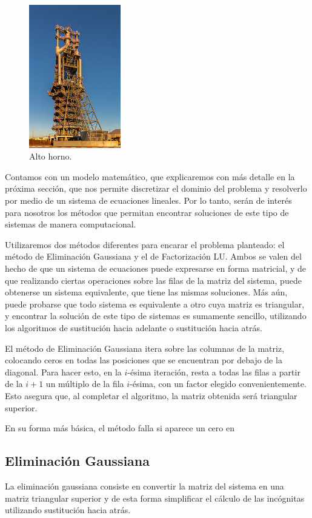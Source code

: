 \documentclass[11pt, a4paper, spanish]{article}
\theoremstyle{plain}
\theoremstyle{remark}
\begin{document}
  \begin{figure}[h]
    \centering
    \includegraphics[width=4cm]{altoHorno.jpg}
    \caption{Alto horno.}
  \end{figure}

  Contamos con un modelo matemático, que explicaremos con más detalle en la próxima sección, que nos permite discretizar el dominio del problema y resolverlo por medio de un sistema de ecuaciones lineales. Por lo tanto, serán de interés para nosotros los métodos que permitan encontrar soluciones de este tipo de sistemas de manera computacional.

  Utilizaremos dos métodos diferentes para encarar el problema planteado: el método de Eliminación Gaussiana y el de Factorización LU. Ambos se valen del hecho de que un sistema de ecuaciones puede expresarse en forma matricial, y de que realizando ciertas operaciones sobre las filas de la matriz del sistema, puede obtenerse un sistema equivalente, que tiene las mismas soluciones. Más aún, puede probarse que todo sistema es equivalente a otro cuya matriz es triangular, y encontrar la solución de este tipo de sistemas es sumamente sencillo, utilizando los algoritmos de sustitución hacia adelante o sustitución hacia atrás.

  El método de Eliminación Gaussiana itera sobre las columnas de la matriz, colocando ceros en todas las posiciones que se encuentran por debajo de la diagonal. Para hacer esto, en la $i$-ésima iteración, resta a todas las filas a partir de la $i + 1$ un múltiplo de la fila $i$-ésima, con un factor elegido convenientemente. Esto asegura que, al completar el algoritmo, la matriz obtenida será triangular superior.

  En su forma más básica, el método falla si aparece un cero en 

    \subsection{Eliminación Gaussiana}
      La eliminación gaussiana consiste en convertir la matriz del sistema en una matriz triangular superior y de esta forma simplificar el cálculo de las incógnitas utilizando sustitución hacia atrás.
\end{document}
